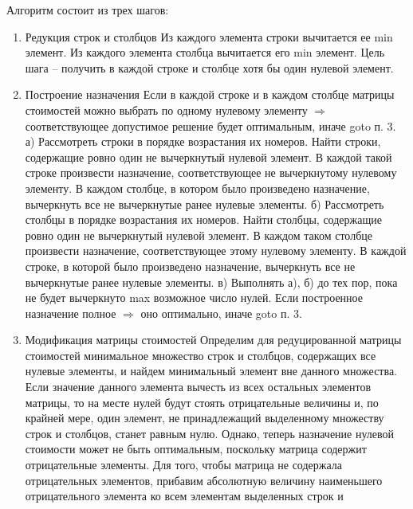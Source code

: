 \documentclass[17pt]{extarticle}
\begin{document}
Алгоритм состоит из трех шагов:
\begin{enumerate}
    \item Редукция строк и столбцов
          \subitem Из каждого элемента строки вычитается ее min элемент.
          \subitem Из каждого элемента столбца вычитается его min элемент.
          \subitem Цель шага – получить в каждой строке и столбце хотя бы один нулевой элемент.
    \item Построение назначения
          Если в каждой строке и в каждом столбце матрицы стоимостей можно
          выбрать по одному нулевому элементу $\Rightarrow$ соответствующее
          допустимое решение будет оптимальным, иначе goto п. 3.
          а) Рассмотреть строки в порядке возрастания их номеров.
          Найти строки, содержащие ровно один не вычеркнутый нулевой
          элемент.
          В каждой такой строке произвести назначение, соответствующее не
          вычеркнутому нулевому элементу.
          В каждом столбце, в котором было произведено назначение,
          вычеркнуть все не вычеркнутые ранее нулевые элементы.
          б) Рассмотреть столбцы в порядке возрастания их номеров.
          Найти столбцы, содержащие ровно один не вычеркнутый
          нулевой элемент.
          В каждом таком столбце произвести назначение,
          соответствующее этому нулевому элементу.
          В каждой строке, в которой было произведено назначение,
          вычеркнуть все не вычеркнутые ранее нулевые элементы.
          в) Выполнять а), б) до тех пор, пока не будет вычеркнуто max
          возможное число нулей.
          Если построенное назначение полное $\Rightarrow$ оно оптимально, иначе
          goto п. 3.
    \item Модификация матрицы стоимостей
          \subitem Определим для редуцированной матрицы стоимостей минимальное
          множество строк и столбцов, содержащих все нулевые элементы, и
          найдем минимальный элемент вне данного множества.
          \subitem Если значение данного элемента вычесть из всех остальных
          элементов матрицы, то на месте нулей будут стоять отрицательные
          величины и, по крайней мере, один элемент, не принадлежащий
          выделенному множеству строк и столбцов, станет равным нулю.
          Однако, теперь назначение нулевой стоимости может не быть
          оптимальным, поскольку матрица содержит отрицательные
          элементы. Для того, чтобы матрица не содержала отрицательных
          элементов, прибавим абсолютную величину наименьшего
          отрицательного элемента ко всем элементам выделенных строк и

\end{enumerate}
\end{document}
